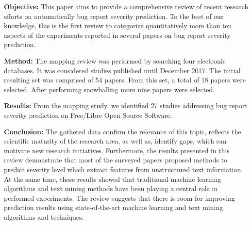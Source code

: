 \textbf{Objective:} This paper aims to provide a comprehensive review of recent research efforts on automatically bug report severity prediction. To the best of our knowledge, this is the first review to categorize quantitatively more than ten aspects of the experiments reported in several papers on bug report severity prediction.

\textbf{Method:} The mapping review was performed by searching four electronic databases. It was considered studies published until December 2017. The initial resulting set was comprised of 54 papers. From this set, a total of 18 papers were selected. After performing snowballing more nine papers were selected.

\textbf{Results:} From the mapping study, we identified 27 studies addressing bug report severity prediction on Free/Libre Open Source Software.

\textbf{Conclusion:} The gathered data confirm the relevance of this topic, reflects the scientific maturity of the research area, as well as, identify gaps, which can motivate new research initiatives. Furthermore, the results presented in this review demonstrate that most of the surveyed papers proposed methods to predict severity level which extract features from unstructured text information. At the same time, these results showed that traditional machine learning algorithms and text mining methods have been playing a central role in performed experiments. The review suggests that there is room for improving prediction results using state-of-the-art machine learning and text mining algorithms and techniques.
